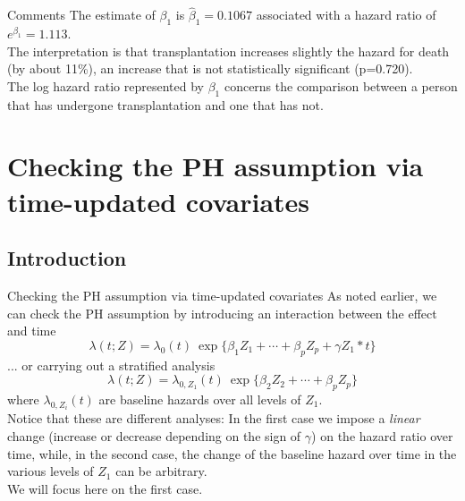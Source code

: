 \documentclass[envcountsect, 10pt, portrait, palatino]{beamer}
\begin{document}
\begin{frame}{Comments}
The estimate of $\beta_1$ is $\hat\beta_1=0.1067$ associated with a hazard ratio 
of $e^{\beta_1}=1.113$. 
\\[2ex]
The interpretation is that transplantation increases slightly the hazard for death  (by about
11\%), an increase that is not statistically significant (p=0.720). 
\\[2ex]
The log hazard ratio represented by $\beta_1$ concerns the comparison between a person
that has undergone transplantation and one that has not.
 \end{frame}
\section{Checking the PH assumption via time-updated covariates}
\subsection{Introduction}
\begin{frame}{Checking the PH assumption via time-updated covariates}
As noted earlier, we can check the PH assumption by introducing an interaction between the effect and time 
\[   \lambda(t; Z)  = \lambda_0(t) ~ \exp\{\beta_1 Z_1 + \cdots + \beta_p Z_p + \gamma Z_1*t\} \]
... or carrying out a stratified analysis
\[   \lambda(t; Z)  = \lambda_{0,Z_1}(t) ~ \exp\{\beta_2 Z_2 + \cdots + \beta_p Z_p\} \]
where $\lambda_{0,Z_i}(t)$ are baseline hazards over all levels of $Z_1$.\\[2ex]
Notice that these are different analyses: In the first case we impose a \textit{linear} change (increase or decrease depending on the sign of $\gamma$) on the hazard ratio over time, while, in the second case, the change of the baseline hazard over time in the various levels of $Z_1$ can be arbitrary.\\[2ex]
We will focus here on the first case.
\end{frame}
\end{document}
